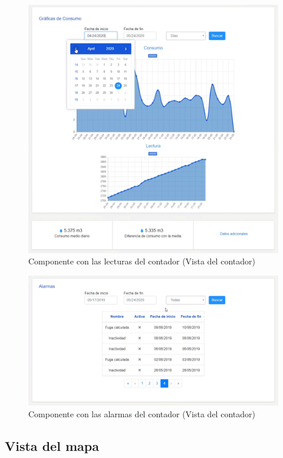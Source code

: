\documentclass[pdftex,11pt,a4paper]{book}
\begin{document}
 \begin{figure}[H]
 \centering
 \includegraphics [scale=0.39] {images/vistas/lecturas-componentes.png}
 \caption{Componente con las lecturas del contador (Vista del contador)} \label{fig:vista-lecturas}
 \end{figure}

 \begin{figure}[H]
 \centering
 \includegraphics [scale=0.50] {images/vistas/alarmas.png}
 \caption{Componente con las alarmas del contador (Vista del contador)} \label{fig:vista-alarmas}
 \end{figure}

\subsection{Vista del mapa}
\end{document}
